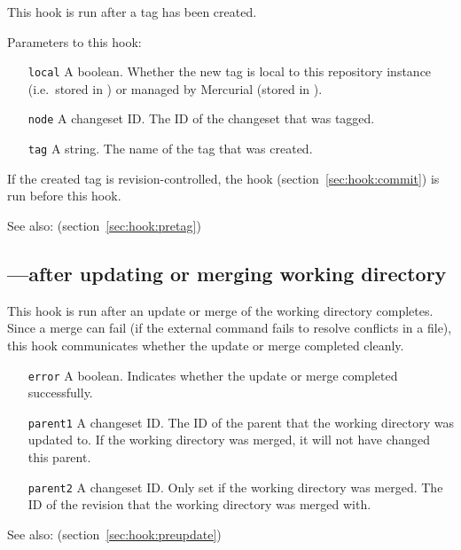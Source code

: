 This hook is run after a tag has been created.

Parameters to this hook:
\begin{itemize}
\item[\texttt{local}] A boolean.  Whether the new tag is local to this
  repository instance (i.e.~stored in ) or
  managed by Mercurial (stored in ).
\item[\texttt{node}] A changeset ID.  The ID of the changeset that was
  tagged.
\item[\texttt{tag}] A string.  The name of the tag that was created.
\end{itemize}

If the created tag is revision-controlled, the  hook
(section~\ref{sec:hook:commit}) is run before this hook.

See also:  (section~\ref{sec:hook:pretag})

\subsection{---after updating or merging working directory}
\label{sec:hook:update}

This hook is run after an update or merge of the working directory
completes.  Since a merge can fail (if the external 
command fails to resolve conflicts in a file), this hook communicates
whether the update or merge completed cleanly.

\begin{itemize}
\item[\texttt{error}] A boolean.  Indicates whether the update or
  merge completed successfully.
\item[\texttt{parent1}] A changeset ID.  The ID of the parent that the
  working directory was updated to.  If the working directory was
  merged, it will not have changed this parent.
\item[\texttt{parent2}] A changeset ID.  Only set if the working
  directory was merged.  The ID of the revision that the working
  directory was merged with.
\end{itemize}

See also:  (section~\ref{sec:hook:preupdate})


